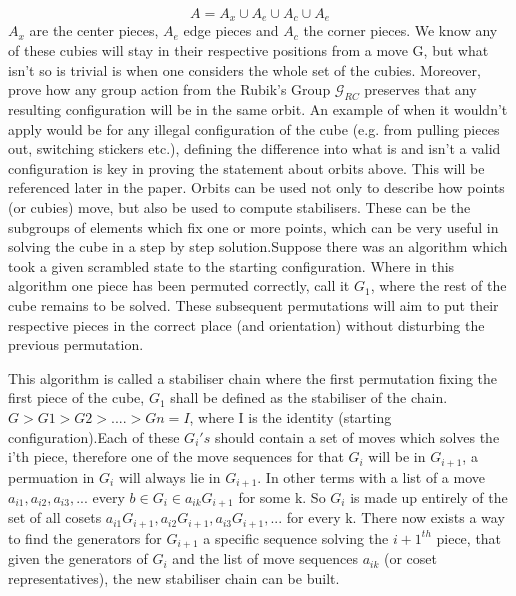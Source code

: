 \documentclass{article}
\newcounter{lem}[section]\setcounter{lem}{0}
\begin{document}
\begin{equation}
A = A_{x}\cup A_{e}\cup A_{c}\cup A_{e}
\end{equation} 
$A_{x}$ are the center pieces, $A_{e}$ edge pieces and $A_{c}$ the corner pieces. We know any of these cubies will stay in their respective positions from a move G, but what isn't so is trivial is when one considers the whole set of the cubies. Moreover, prove how any group action from the Rubik's Group $\mathcal{G}_{RC}$ preserves that any resulting configuration will be in the same orbit. 
An example of when it wouldn't apply would be for  any illegal configuration of the cube (e.g. from pulling pieces out, switching stickers etc.), defining the difference into what is and isn't a valid configuration is key in proving the statement about orbits above. This will be referenced later in the paper.
Orbits can be used not only to describe how points (or cubies) move, but also be used to compute stabilisers. These can be the subgroups of elements which fix one or more points, which can be very useful in solving the cube in a step by step solution\cite{PermGroups}.\newline Suppose there was an algorithm which took a given scrambled state to the starting configuration. Where in this algorithm one piece has been permuted correctly, call it $G_{1}$, where the rest of the cube remains to be solved. These subsequent permutations will aim to put their respective pieces in the correct place (and orientation) without disturbing the previous permutation.   

This algorithm is called a stabiliser chain where the first permutation fixing the first piece of the cube, $G_{1}$ shall be defined as the stabiliser of the chain. $G > G1 > G2 > .... > Gn = I$, where I is the identity (starting configuration).Each of these $G_{i}'s$ should contain a set of moves which solves the i'th piece, therefore one of the move sequences for that $G_{i}$ will be in $G_{i+1}$, a permuation in $G_{i}$ will always lie in $G_{i+1}$. In other terms with a list  of a move $a_{i1},a_{i2},a_{i3}, ...$ every $b \in G_{i} \in a_{ik}G_{i+1}$ for some k. So $G_{i}$ is made up entirely of the set of all cosets $a_{i1}G_{i+1}, a_{i2}G_{i+1}, a_{i3}G_{i+1}, ... $ for every k. There now exists a way to find the generators for $G_{i+1}$ a specific sequence solving the ${i+1}^{th}$ piece, that given the generators of $G_{i}$ and the list of move sequences $a_{ik}$ (or coset representatives), the new stabiliser chain can be built\cite{Schreier}.
\end{document}
